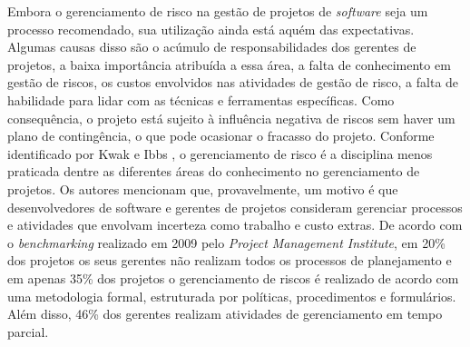Embora o gerenciamento de risco na gestão de projetos de \textit{software} seja um processo recomendado, sua utilização ainda está aquém das expectativas. Algumas causas disso são o acúmulo de responsabilidades dos gerentes de projetos, a baixa importância atribuída a essa área, a falta de conhecimento em gestão de riscos, os custos envolvidos nas atividades de gestão de risco, a falta de habilidade para lidar com as técnicas e ferramentas específicas. Como consequência, o projeto está sujeito à influência negativa de riscos sem haver um plano de contingência, o que pode ocasionar o fracasso do projeto. Conforme identificado por Kwak e Ibbs \cite{kwak2000calculating}, o gerenciamento de risco é a disciplina menos praticada dentre as diferentes áreas do conhecimento no gerenciamento de projetos. Os autores mencionam que, provavelmente, um motivo é que desenvolvedores de software e gerentes de projetos consideram gerenciar processos e atividades que envolvam incerteza como trabalho e custo extras. De acordo com o \textit{benchmarking} realizado em 2009 pelo \textit{Project Management Institute}, em 20\% dos projetos os seus gerentes não realizam todos os processos de planejamento e em apenas 35\% dos projetos o gerenciamento de riscos é realizado de acordo com uma metodologia formal, estruturada por políticas, procedimentos e formulários. Além disso, 46\% dos gerentes realizam atividades de gerenciamento em tempo parcial.


